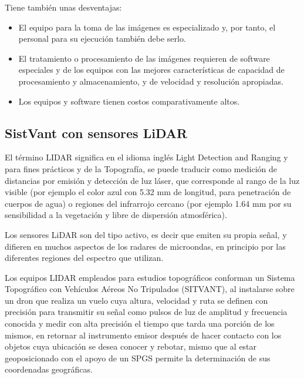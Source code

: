 Tiene también unas desventajas:

\begin{itemize}
    \item El equipo para la toma de las imágenes es especializado y, por tanto, el personal para su ejecución también debe serlo.
    \item El tratamiento o procesamiento de las imágenes requieren de software especiales y de los equipos con las mejores características de capacidad de procesamiento y almacenamiento, y de velocidad y resolución apropiadas.
    \item Los equipos y software tienen costos comparativamente altos.
\end{itemize}

\subsection{SistVant con sensores LiDAR}

\begin{definition}[LiDAR]
    El término LIDAR significa en el idioma inglés Light Detection and Ranging y para fines prácticos y de la Topografía, se puede traducir como medición de distancias por emisión y detección de luz láser, que corresponde al rango de la luz visible (por ejemplo el color azul con 5.32 mm de longitud, para penetración de cuerpos de agua) o regiones del infrarrojo cercano (por ejemplo 1.64 mm por su sensibilidad a la vegetación y libre de dispersión atmosférica).
\end{definition}
Los sensores LiDAR son del tipo activo, es decir que emiten su propia señal, y difieren en muchos aspectos de los radares de microondas, en principio por las diferentes regiones del espectro que utilizan.

Los equipos LIDAR empleados para estudios topográficos conforman un Sistema Topográfico con Vehículos Aéreos No Tripulados (SITVANT), al instalarse sobre un dron que realiza un vuelo cuya altura, velocidad y ruta se definen con precisión para transmitir su señal como pulsos de luz de amplitud y frecuencia conocida y medir con alta precisión el tiempo que tarda una porción de los mismos, en retornar al instrumento emisor después de hacer contacto con los objetos cuya ubicación se desea conocer y rebotar, mismo que al estar geoposicionado con el apoyo de un SPGS permite la determinación de sus coordenadas geográficas.

